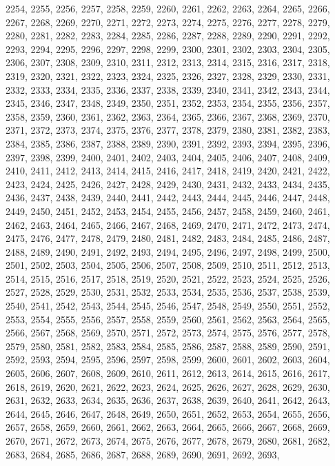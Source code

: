 \documentclass[a4paper,11pt]{article}
\begin{document}
2254, 2255, 2256, 2257, 2258, 2259, 2260, 2261, 2262, 2263, 2264,
2265, 2266, 2267, 2268, 2269, 2270, 2271, 2272, 2273, 2274, 2275,
2276, 2277, 2278, 2279, 2280, 2281, 2282, 2283, 2284, 2285, 2286,
2287, 2288, 2289, 2290, 2291, 2292, 2293, 2294, 2295, 2296, 2297,
2298, 2299, 2300, 2301, 2302, 2303, 2304, 2305, 2306, 2307, 2308,
2309, 2310, 2311, 2312, 2313, 2314, 2315, 2316, 2317, 2318, 2319,
2320, 2321, 2322, 2323, 2324, 2325, 2326, 2327, 2328, 2329, 2330,
2331, 2332, 2333, 2334, 2335, 2336, 2337, 2338, 2339, 2340, 2341,
2342, 2343, 2344, 2345, 2346, 2347, 2348, 2349, 2350, 2351, 2352,
2353, 2354, 2355, 2356, 2357, 2358, 2359, 2360, 2361, 2362, 2363,
2364, 2365, 2366, 2367, 2368, 2369, 2370, 2371, 2372, 2373, 2374,
2375, 2376, 2377, 2378, 2379, 2380, 2381, 2382, 2383, 2384, 2385,
2386, 2387, 2388, 2389, 2390, 2391, 2392, 2393, 2394, 2395, 2396,
2397, 2398, 2399, 2400, 2401, 2402, 2403, 2404, 2405, 2406, 2407,
2408, 2409, 2410, 2411, 2412, 2413, 2414, 2415, 2416, 2417, 2418,
2419, 2420, 2421, 2422, 2423, 2424, 2425, 2426, 2427, 2428, 2429,
2430, 2431, 2432, 2433, 2434, 2435, 2436, 2437, 2438, 2439, 2440,
2441, 2442, 2443, 2444, 2445, 2446, 2447, 2448, 2449, 2450, 2451,
2452, 2453, 2454, 2455, 2456, 2457, 2458, 2459, 2460, 2461, 2462,
2463, 2464, 2465, 2466, 2467, 2468, 2469, 2470, 2471, 2472, 2473,
2474, 2475, 2476, 2477, 2478, 2479, 2480, 2481, 2482, 2483, 2484,
2485, 2486, 2487, 2488, 2489, 2490, 2491, 2492, 2493, 2494, 2495,
2496, 2497, 2498, 2499, 2500, 2501, 2502, 2503, 2504, 2505, 2506,
2507, 2508, 2509, 2510, 2511, 2512, 2513, 2514, 2515, 2516, 2517,
2518, 2519, 2520, 2521, 2522, 2523, 2524, 2525, 2526, 2527, 2528,
2529, 2530, 2531, 2532, 2533, 2534, 2535, 2536, 2537, 2538, 2539,
2540, 2541, 2542, 2543, 2544, 2545, 2546, 2547, 2548, 2549, 2550,
2551, 2552, 2553, 2554, 2555, 2556, 2557, 2558, 2559, 2560, 2561,
2562, 2563, 2564, 2565, 2566, 2567, 2568, 2569, 2570, 2571, 2572,
2573, 2574, 2575, 2576, 2577, 2578, 2579, 2580, 2581, 2582, 2583,
2584, 2585, 2586, 2587, 2588, 2589, 2590, 2591, 2592, 2593, 2594,
2595, 2596, 2597, 2598, 2599, 2600, 2601, 2602, 2603, 2604, 2605,
2606, 2607, 2608, 2609, 2610, 2611, 2612, 2613, 2614, 2615, 2616,
2617, 2618, 2619, 2620, 2621, 2622, 2623, 2624, 2625, 2626, 2627,
2628, 2629, 2630, 2631, 2632, 2633, 2634, 2635, 2636, 2637, 2638,
2639, 2640, 2641, 2642, 2643, 2644, 2645, 2646, 2647, 2648, 2649,
2650, 2651, 2652, 2653, 2654, 2655, 2656, 2657, 2658, 2659, 2660,
2661, 2662, 2663, 2664, 2665, 2666, 2667, 2668, 2669, 2670, 2671,
2672, 2673, 2674, 2675, 2676, 2677, 2678, 2679, 2680, 2681, 2682,
2683, 2684, 2685, 2686, 2687, 2688, 2689, 2690, 2691, 2692, 2693,
\end{document}
